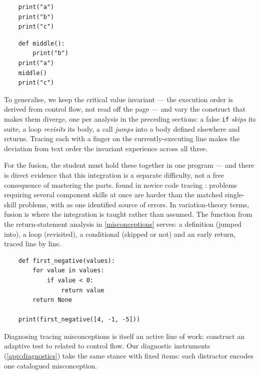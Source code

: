 \hfill
\begin{minipage}[t]{0.45\columnwidth}
  \begin{verbatim}
    print("a")
    print("b")
    print("c")
  \end{verbatim}
\end{minipage}
\hfill
\begin{minipage}[t]{0.45\columnwidth}
  \begin{verbatim}
    def middle():
        print("b")
    print("a")
    middle()
    print("c")
  \end{verbatim}
\end{minipage}

To generalise, we keep the critical value invariant --- the execution order
is derived from control flow, not read off the page --- and vary the
construct that makes them diverge, one per analysis in the preceding
sections: a false \texttt{if} \emph{skips} its suite, a loop
\emph{revisits} its body, a call \emph{jumps} into a body defined elsewhere
and returns. Tracing each with a finger on the currently-executing line
makes the deviation from text order the invariant experience across all
three.

For the fusion, the student must hold these together in one program --- and
there is direct evidence that this integration is a separate difficulty, not
a free consequence of mastering the parts.
\textcite{Huang2024Composition} found in novice code tracing
: problems requiring several component skills at once are harder
than the matched single-skill problems, with
 as one identified source of errors.
In variation-theory terms, fusion is where the integration is taught rather
than assumed. The function from the return-statement analysis in
\cref{misconceptions} serves: a definition (jumped into), a loop (revisited),
a conditional (skipped or not) and an early return, traced line by line.

\begin{verbatim}
    def first_negative(values):
        for value in values:
            if value < 0:
                return value
        return None

    print(first_negative([4, -1, -5]))
\end{verbatim}

Diagnosing tracing misconceptions is itself an active line of work:
\textcite{Bastian2026AdaptiveTracing} construct an adaptive test to
related to control flow. Our diagnostic instruments
(\cref{app:diagnostics}) take the same stance with fixed items: each
distractor encodes one catalogued misconception.

